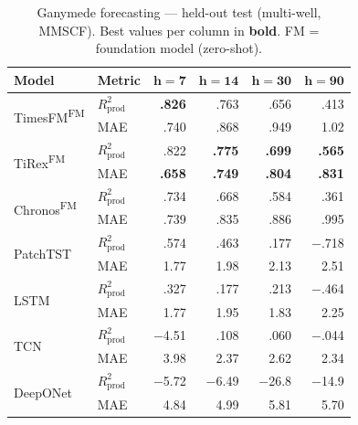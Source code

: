 \documentclass[11pt]{article}
\newcommand{\best}[1]{\textbf{#1}}
\newcommand{\fm}{\textsuperscript{FM}}
\newcommand{\rp}{R^2_\text{prod}}
\begin{document}
\begin{table}[ht]
\centering
\caption{Ganymede forecasting — held-out test (multi-well, MMSCF).
Best values per column in \textbf{bold}.
FM = foundation model (zero-shot).}
\label{tab:ganymede_main}
\small
\setlength{\tabcolsep}{2.5pt}
\begin{tabular}{@{}ll rrrr @{}}
\toprule
\textbf{Model} & \textbf{Metric} & $\boldsymbol{h{=}7}$ & $\boldsymbol{h{=}14}$ & $\boldsymbol{h{=}30}$ & $\boldsymbol{h{=}90}$ \\
\midrule
\multirow{2}{*}{TimesFM\fm}
 & $\rp$ & \best{.826} & .763 & .656 & .413 \\
 & MAE   & .740 & .868 & .949 & 1.02 \\
\midrule
\multirow{2}{*}{TiRex\fm}
 & $\rp$ & .822 & \best{.775} & \best{.699} & \best{.565} \\
 & MAE   & \best{.658} & \best{.749} & \best{.804} & \best{.831} \\
\midrule
\multirow{2}{*}{Chronos\fm}
 & $\rp$ & .734 & .668 & .584 & .361 \\
 & MAE   & .739 & .835 & .886 & .995 \\
\midrule
\multirow{2}{*}{PatchTST}
 & $\rp$ & .574 & .463 & .177 & $-$.718 \\
 & MAE   & 1.77 & 1.98 & 2.13 & 2.51 \\
\midrule
\multirow{2}{*}{LSTM}
 & $\rp$ & .327 & .177 & .213 & $-$.464 \\
 & MAE   & 1.77 & 1.95 & 1.83 & 2.25 \\
\midrule
\multirow{2}{*}{TCN}
 & $\rp$ & $-$4.51 & .108 & .060 & $-$.044 \\
 & MAE   & 3.98 & 2.37 & 2.62 & 2.34 \\
\midrule
\multirow{2}{*}{DeepONet}
 & $\rp$ & $-$5.72 & $-$6.49 & $-$26.8 & $-$14.9 \\
 & MAE   & 4.84 & 4.99 & 5.81 & 5.70 \\
\bottomrule
\end{tabular}
\end{table}
\end{document}

